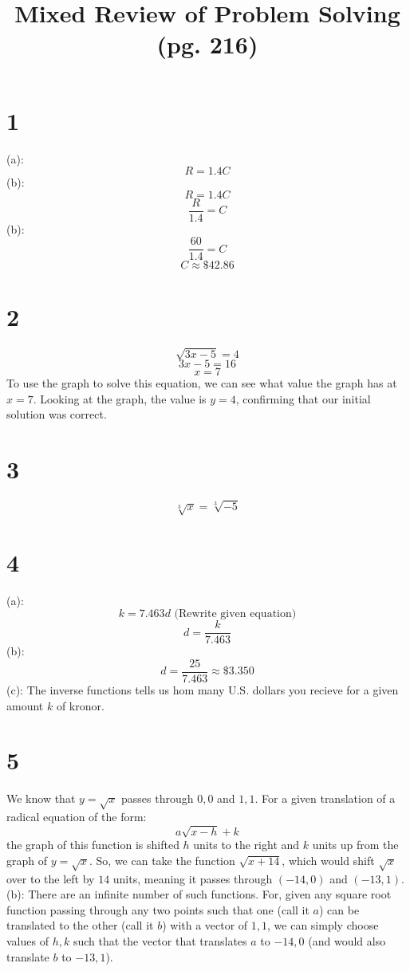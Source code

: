 \documentclass{article}
\title{Mixed Review of Problem Solving (pg. 216)}
\theoremstyle{definition}
\newcommand{\?}{\stackrel{?}{=}}
\begin{document}
\maketitle

\section*{1}
(a): \[ R=1.4C \]
(b): \[ R=1.4C \] \[ \frac{R}{1.4}=C \]
(b): \[ \frac{60}{1.4}=C \] \[ C\approx \$ 42.86 \]

\section*{2}
\[ \sqrt{3x-5}=4 \]
\[ 3x-5=16 \]
\[ x=7 \]
To use the graph to solve this equation, we can see what value the graph has at $x=7$. Looking at the graph, the value is $y=4$, 
confirming that our initial solution was correct.

\section*{3}
\[ \sqrt[3]{x}=\sqrt[3]{-5} \]

\section*{4}
(a): \[ k=7.463d\textrm{ (Rewrite given equation)} \] \[ d=\frac{k}{7.463} \]
(b): \[ d=\frac{25}{7.463}\approx \$ 3.350 \]
(c): The inverse functions tells us hom many U.S. dollars you recieve for a given amount $k$ of kronor.

\section*{5}
We know that $y=\sqrt{x}$ passes through $0,0$ and $1,1$. For a given translation of a radical equation of the form:
\[ a\sqrt{x-h}+k \] the graph of this function is shifted $h$ units to the right and $k$ units up from the graph of $y=\sqrt{x}$. 
So, we can take the function $\sqrt{x+14}$, which would shift $\sqrt{x}$ over to the left by $14$ units, meaning it passes through 
$(-14,0)$ and $(-13,1)$.
(b): There are an infinite number of such functions. For, given any square root function passing through any two points such that one (call it $a$) can be 
translated to the other (call it $b$) with a vector of $1,1$, we can simply choose values of $h,k$ such that the vector that translates $a$ to 
$-14,0$ (and would also translate $b$ to $-13,1$).
\end{document}
